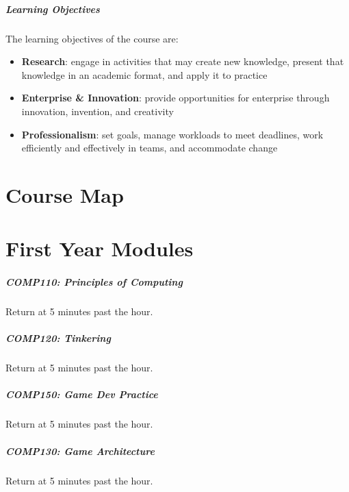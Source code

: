 \begin{frame}
	\frametitle{Learning Objectives}
	
	The learning objectives of the course are:
	
	\begin{itemize}
		\item \textbf{Research}: engage in activities that may create new knowledge, present that knowledge in an academic format, and apply it to practice\pause
		\item \textbf{Enterprise \& Innovation}: provide opportunities for enterprise through innovation, invention, and creativity\pause
		\item \textbf{Professionalism}: set goals, manage workloads to meet deadlines, work efficiently and effectively in teams, and accommodate change
	\end{itemize}
\end{frame}

\part{Course Map}
\frame{\partpage}




\part{First Year Modules}
\frame{\partpage}

\begin{frame}
	\frametitle{COMP110: Principles of Computing}
	
	Return at 5 minutes past the hour.

\end{frame}

\begin{frame}
	\frametitle{COMP120: Tinkering}
	
	Return at 5 minutes past the hour.

\end{frame}

\begin{frame}
	\frametitle{COMP150: Game Dev Practice}
	
	Return at 5 minutes past the hour.

\end{frame}

\begin{frame}
	\frametitle{COMP130: Game Architecture}
	
	Return at 5 minutes past the hour.

\end{frame}

